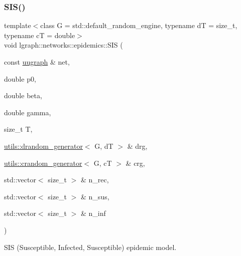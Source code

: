 \subsubsection{\texorpdfstring{S\+I\+S()}{SIS()}\hspace{0.1cm}{\footnotesize\ttfamily [1/2]}}
{\footnotesize\ttfamily template$<$class G  = std\+::default\+\_\+random\+\_\+engine, typename dT  = size\+\_\+t, typename cT  = double$>$ \\
void lgraph\+::networks\+::epidemics\+::\+S\+IS (\begin{DoxyParamCaption}\item[{const \hyperlink{classlgraph_1_1uugraph}{uugraph} \&}]{net,  }\item[{double}]{p0,  }\item[{double}]{beta,  }\item[{double}]{gamma,  }\item[{size\+\_\+t}]{T,  }\item[{\hyperlink{classlgraph_1_1utils_1_1drandom__generator}{utils\+::drandom\+\_\+generator}$<$ G, dT $>$ \&}]{drg,  }\item[{\hyperlink{classlgraph_1_1utils_1_1crandom__generator}{utils\+::crandom\+\_\+generator}$<$ G, cT $>$ \&}]{crg,  }\item[{std\+::vector$<$ size\+\_\+t $>$ \&}]{n\+\_\+rec,  }\item[{std\+::vector$<$ size\+\_\+t $>$ \&}]{n\+\_\+sus,  }\item[{std\+::vector$<$ size\+\_\+t $>$ \&}]{n\+\_\+inf }\end{DoxyParamCaption})}



S\+IS (Susceptible, Infected, Susceptible) epidemic model. 


